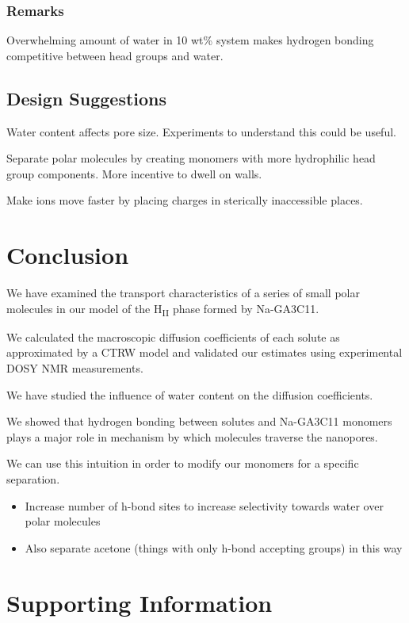 \documentclass{article}
\begin{document}
  \subsubsection*{Remarks}
   
  Overwhelming amount of water in 10 wt\% system makes hydrogen bonding
  competitive between head groups and water.

  \subsection{Design Suggestions}

  Water content affects pore size. Experiments to understand this could be useful.

  Separate polar molecules by creating monomers with more hydrophilic head group components.
  More incentive to dwell on walls.

  Make ions move faster by placing charges in sterically inaccessible places. 

  \section{Conclusion}

  We have examined the transport characteristics of a series of small polar
  molecules in our model of the H\textsubscript{II} phase formed by 
  Na-GA3C11.

  We calculated the macroscopic diffusion coefficients of each solute as 
  approximated by a CTRW model and validated our estimates using experimental
  DOSY NMR measurements.

  We have studied the influence of water content on the diffusion coefficients.

  We showed that hydrogen bonding between solutes and Na-GA3C11 monomers plays
  a major role in mechanism by which molecules traverse the nanopores. 

  We can use this intuition in order to modify our monomers for a specific 
  separation.
  \begin{itemize}
	\item Increase number of h-bond sites to increase selectivity towards water 
	over polar molecules
	\item Also separate acetone (things with only h-bond accepting groups) in this way
  \end{itemize}
  
 
  \section*{Supporting Information}
\end{document}
